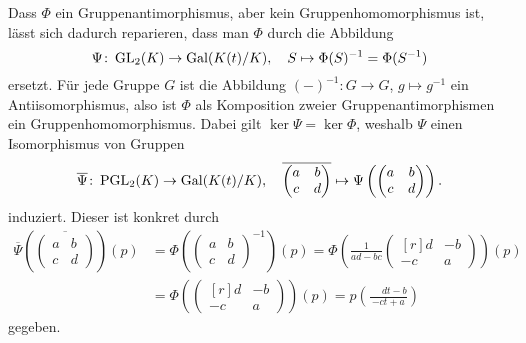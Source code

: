 \documentclass[a4paper,10pt,numbers=noenddot]{scrartcl}
\begin{document}
\begin{remark}
  Dass $\Phi$ ein Gruppenantimorphismus, aber kein Gruppenhomomorphismus ist, lässt sich dadurch reparieren, dass man $\Phi$ durch die Abbildung
  \[
            \Psi
    \colon  \operatorname{GL}_2(K) \to \operatorname{Gal}(K(t)/K),
    \quad   S \mapsto \Phi(S)^{-1} = \Phi(S^{-1})
  \]
  ersetzt.
  Für jede Gruppe $G$ ist die Abbildung $(-)^{-1} \colon G \to G$, $g \mapsto g^{-1}$ ein Antiisomorphismus, also ist $\Phi$ als Komposition zweier Gruppenantimorphismen ein Gruppenhomomorphismus.
  Dabei gilt $\ker \Psi = \ker \Phi$, weshalb $\Psi$ einen Isomorphismus von Gruppen
  \[
    \overline{\Psi}
    \colon
    \operatorname{PGL}_2(K) \to \operatorname{Gal}(K(t)/K),
    \quad
    \overline{
    \begin{pmatrix}
      a & b
      \\
      c & d
    \end{pmatrix}
    }
    \mapsto
    \Psi
    \left(
      \begin{pmatrix}
        a & b
        \\
        c & d
      \end{pmatrix}
    \right).
  \]
  induziert.
  Dieser ist konkret durch
  \begin{align*}
    \overline{\Psi}
    \left(
      \overline{
        \begin{pmatrix}
          a & b
          \\
          c & d
        \end{pmatrix}
      }
    \right)
    (p)
    &=
    \Phi
    \left(
      \begin{pmatrix}
        a & b
        \\
        c & d
      \end{pmatrix}^{-1}
    \right)
    (p)
    =
    \Phi
    \left(
      \frac{1}{ad - bc}
      \begin{pmatrix*}[r]
         d  & -b
        \\
        -c  &  a
      \end{pmatrix*}
    \right)
    (p)
    \\
    &=
    \Phi
    \left(
      \begin{pmatrix*}[r]
         d  & -b
        \\
        -c  &  a
      \end{pmatrix*}
    \right)
    (p)
    =
    p\left( \frac{\phantom{-}dt - b}{-ct + a} \right)
  \end{align*}
  gegeben.
\end{remark}
\end{document}
